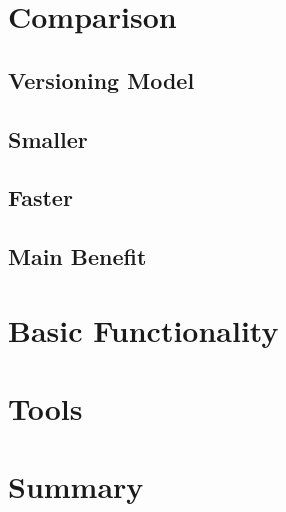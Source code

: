 \begin{frame}
 \titlepage
\end{frame}

\section{Comparison}
	
	\subsection{Versioning Model}
	
	\subsection{Smaller}
	
	\subsection{Faster}
	
	\subsection{Main Benefit}
	
\section{Basic Functionality}












\section{Tools}

\section{Summary}


